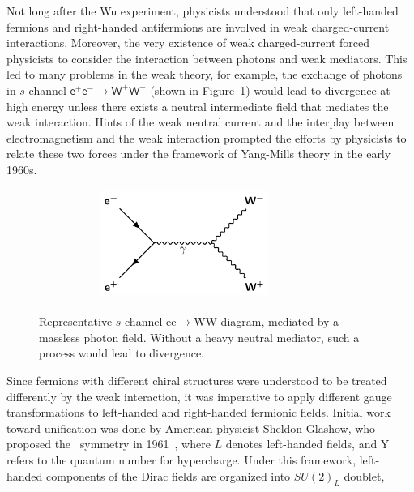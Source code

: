 Not long after the Wu experiment, physicists understood that only left-handed fermions and right-handed antifermions are involved in weak charged-current interactions. Moreover, the very existence of weak charged-current forced physicists to consider the interaction between photons and weak mediators. This led to many problems in the weak theory, for example, the exchange of photons in $s$-channel $\textsf{e}^{+}\textsf{e}^{-}\rightarrow\textsf{W}^{+}\textsf{W}^{-}$ (shown in Figure~\ref{fig:eeWW}) would lead to divergence at high energy unless there exists a neutral intermediate field that mediates the weak interaction. Hints of the weak neutral current and the interplay between electromagnetism and the weak interaction prompted the efforts by physicists to relate these two forces under the framework of Yang-Mills theory in the early 1960s. 

\begin{figure}[tbh!]
 \begin{center}
 \begin{tabular}{c}
 \includegraphics[width=0.6\textwidth]{figures/Part1/SM/eeWW}
 \end{tabular}
 \caption{Representative $s$ channel ee$\rightarrow$WW diagram, mediated by a massless photon field. Without a heavy neutral mediator, such a process would lead to divergence.}
 \label{fig:eeWW}
 \end{center}
\end{figure}

Since fermions with different chiral structures were understood to be treated differently by the weak interaction, it was 
imperative to apply different gauge transformations to left-handed and right-handed fermionic fields. Initial work toward unification was done by American physicist Sheldon Glashow, who proposed the \ew~symmetry in 1961~\cite{Glashow:1961tr}, where $L$ denotes left-handed fields, and Y refers to the quantum number for hypercharge. Under this framework, left-handed components of the Dirac fields are organized into $SU(2)_{L}$ doublet,

